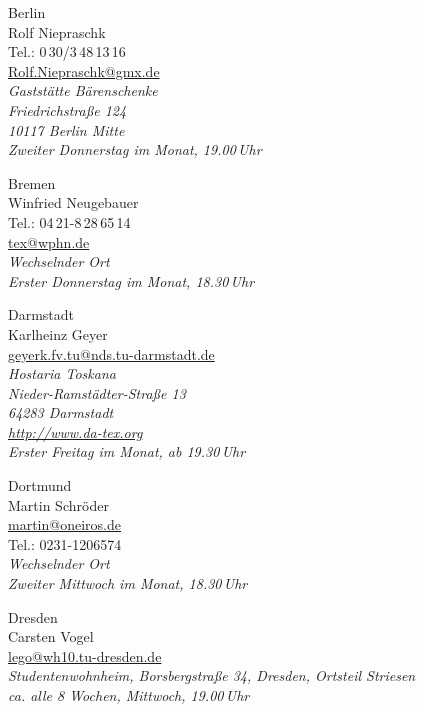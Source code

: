 \begin{multicols}{2}
\begin{roll}
  \item[Berlin] \ \\
    Rolf Niepraschk\\               %
    Tel.: 0\,30/3\,48\,13\,16\\
    \url{Rolf.Niepraschk@gmx.de}\\
    \emph{Gaststätte Bärenschenke\\
            Friedrichstraße 124\\
      10117 Berlin Mitte\\
      Zweiter Donnerstag im Monat, 
      19.00\,Uhr}
%
  \item[Bremen]  \ \\
    Winfried Neugebauer\\       
    Tel.: 04\,21-8\,28\,65\,14\\
    \url{tex@wphn.de}\\
    \emph{Wechselnder Ort\\
      Erster Donnerstag im Monat,
      18.30\,Uhr}
%
%
  \item[Darmstadt]  \ \\
    Karlheinz Geyer\\
    \url{geyerk.fv.tu@nds.tu-darmstadt.de}\\
    \emph{Hostaria Toskana\\
      Nieder-Ramstädter-Straße 13\\
      64283 Darmstadt\\
      \url{http://www.da-tex.org}\\
      Erster Freitag im Monat, ab 19.30\,Uhr}
%
  \item[Dortmund]  \ \\
    Martin Schr\"oder\\
    \url{martin@oneiros.de}\\
    Tel.: 0231-1206574\\
    \emph{Wechselnder Ort\\
      Zweiter Mittwoch im Monat, 18.30\,Uhr}
% 
  \item[Dresden]  \ \\
    Carsten Vogel\\
    \url{lego@wh10.tu-dresden.de}\\
    \emph{Studentenwohnheim,
      Borsbergstraße 34, Dresden, Ortsteil Striesen\\
      ca. alle 8 Wochen, Mittwoch, 19.00\,Uhr}


\end{roll}
\end{multicols}
